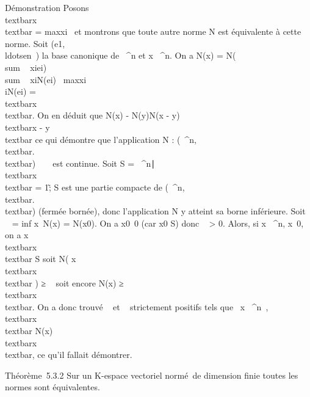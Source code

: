Démonstration Posons
\\textbar{}x\\textbar{}
= max\textbar{}xi~\textbar{} et
montrons que toute autre norme N est équivalente à cette norme. Soit
(e1,\\ldotsen~)
la base canonique de ~^n et x \in {}~^n. On a N(x) =
N(\\sum ~
xiei)
\leq\\sum ~
\textbar{}xi\textbar{}N(ei)
\leq\
max\textbar{}xi\textbar{}\\\sum
 iN(ei) =
\beta~\\textbar{}x\\textbar{}. On en déduit que
\textbar{}N(x) - N(y)\textbar{}\leq N(x - y) \leq \beta~\\textbar{}x
- y\\textbar{} ce qui démontre que l'application N :
(~^n,\\textbar{}.\\textbar{}) \rightarrow~
~ est continue. Soit S = \x \in
\mathbb{R}~^n∣\\textbar{}x\\textbar{}
= 1\~; S est une partie compacte de
(~^n,\\textbar{}.\\textbar{})
(fermée bornée), donc l'application N y atteint sa borne inférieure.
Soit \alpha~ = inf x\inS~N(x) =
N(x0). On a x0\neq~0 (car
x0 \in S) donc \alpha~ \textgreater{} 0. Alors, si x \in {}~^n,
x\neq~0, on a  x \over
\\textbar{}x\\textbar{} \in S soit N( x
\over
\\textbar{}x\\textbar{} ) ≥ \alpha~ soit
encore N(x) ≥ \alpha~\\textbar{}x\\textbar{}. On
a donc trouvé \alpha~ et \beta~ strictement positifs tels que
\forall~x \in {}~^n~,
\alpha~\\textbar{}x\\textbar{} \leq N(x) \leq
\beta~\\textbar{}x\\textbar{}, ce qu'il fallait
démontrer.

Théorème~5.3.2 Sur un K-espace vectoriel normé~de dimension finie toutes
les normes sont équivalentes.

